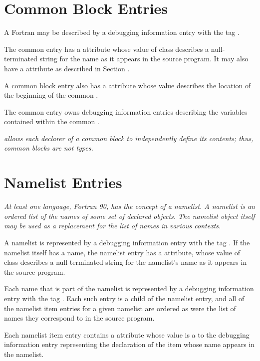 \section{Common Block Entries}
\label{chap:commonblockentries}
A Fortran   
may 
be described by a debugging
information entry with the 
tag \DWTAGcommonblockTARG. 

The common  
entry has a \DWATname{} attribute 
whose value of class \CLASSstring{} describes a null-terminated
string for the
name as it appears in the source program. It may also have a
\DWATlinkagename{} attribute as described in 
Section . 

A common block entry also has a \DWATlocation{} attribute
whose value describes the
location of the beginning of the common . 

The common
 entry owns debugging information entries describing
the variables contained within the common .

\textit{ allows each declarer of a common block 
to independently define its contents; thus, common blocks are not types.}

\section{Namelist Entries}
\label{chap:namelistentries}
\textit{At least one language, Fortran 90, has the concept of a
namelist. A namelist is an ordered list of the names of some
set of declared objects. The namelist object itself may be used
as a replacement for the list of names in various contexts.}

A namelist is represented by a debugging information entry
with the 
tag \DWTAGnamelistTARG. 
If the namelist itself has a
name, the namelist entry has a \DWATname{} attribute,
whose value of class \CLASSstring{} describes a null-terminated
string for the namelist\textquoteright s
name as it appears in the source program.

Each 
\hypertarget{chap:DWATnamelistitemnamelistitem}{}
name that is part of the namelist is represented
by a debugging information entry with the tag
\DWTAGnamelistitemTARG. 
Each such entry is a child of the
namelist entry, and all of the 
namelist item entries for a
given namelist are ordered as were the list of names they
correspond to in the source program.

Each namelist item entry contains a 
\DWATnamelistitem{} attribute
whose 
value is a  to the debugging
information entry representing the declaration of the item
whose name appears in the namelist.


